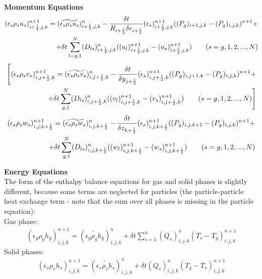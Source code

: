 {\bf Momentum Equations}\\
%
\begin{eqnarray}
\htmlimage{}
(\epsilon_s \rho_s u_s)_{i+\frac{1}{2},j,k}^{n+1} =
(\widetilde{\epsilon_s \rho_s u_s})_{i+\frac{1}{2},j,k}^{n} -
\frac{\delta t}{R_{i+\frac{1}{2}}\delta r_{i+\frac{1}{2}}} 
(\epsilon_s)_{i+\frac{1}{2},j,k}^{n+1}
((P_g)_{i+1,j,k} - (P_g)_{i,j,k})^{n+1} + \nonumber \\
+\delta t \sum_{l=g,1}^{N} (D_{ls})^n_{i+\frac{1}{2},j,k}
((u_l)_{i+\frac{1}{2},j,k}^{n+1} - (u_s)_{i+\frac{1}{2},j,k}^{n+1})
\qquad (s=g,1,2,...,N)
\nonumber
\end{eqnarray}
%
\begin{eqnarray}
\htmlimage{}
\Bigg[
(\epsilon_s \rho_s v_s)_{i,j+\frac{1}{2},k}^{n+1} =
(\widetilde{\epsilon_s \rho_s v_s})_{i,j+\frac{1}{2},k}^{n} -
\frac{\delta t}{\delta y_{j+\frac{1}{2}}} (\epsilon_s)_{i,j+\frac{1}{2},k}^{n+1}
((P_g)_{i,j+1,k} - (P_g)_{i,j,k})^{n+1} + 
\nonumber \\ 
+ \delta t \sum_{g,1}^{N} (D_{ls})^n_{i,j+\frac{1}{2},k}
((v_l)_{i,j+\frac{1}{2},k}^{n+1} - (v_s)_{i,j+\frac{1}{2},k}^{n+1})
\qquad (s=g,1,2,...,N)
\Bigg]
\nonumber
\end{eqnarray}
%
\begin{eqnarray}
\htmlimage{}
(\epsilon_s \rho_s w_s)_{i,j,k+\frac{1}{2}}^{n+1} =
(\widetilde{\epsilon_s \rho_s w_s})_{i,j,k+\frac{1}{2}}^{n} -
\frac{\delta t}{\delta z_{k+\frac{1}{2}}} (\epsilon_s)_{i,j,k+\frac{1}{2}}^{n+1}
((P_g)_{i,j,k+1} - (P_g)_{i,j,k})^{n+1} + \nonumber \\
+ \delta t \sum_{g,1}^{N} (D_{ls})^n_{i,j,k+\frac{1}{2}}
((w_l)_{i,j,k+\frac{1}{2}}^{n+1} - (w_s)_{i,j,k+\frac{1}{2}}^{n+1})
\qquad (s=g,1,2,...,N)
\nonumber
\end{eqnarray}
%

{\bf Energy Equations}\\
The form of the enthalpy balance equations for gas and solid phases is 
slightly different, because some terms are neglected for particles
(the particle-particle heat exchange term - note that the sum over
all phases is missing in the particle equation):\\

%
Gas phase:
%
\begin{eqnarray}
(\epsilon_g \rho_g h_g)_{i,j,k}^{n+1} = 
(\widetilde{\epsilon_g \rho_g h_g})^n_{i,j,k} +
\delta t \sum_{s=1}^{n} (Q_s)_{i,j,k}^{n} (T_s - T_g)_{i,j,k}^{n+1}
\nonumber
\end{eqnarray}
%
Solid phases:
%
\begin{eqnarray}
(\epsilon_s \rho_s h_s)_{i,j,k}^{n+1} = 
(\widetilde{\epsilon_s \rho_s h_s})^n_{i,j,k} +
\delta t  (Q_s)_{i,j,k}^{n} (T_g - T_s)_{i,j,k}^{n+1}
\nonumber
\end{eqnarray}
%
\newpage
%

